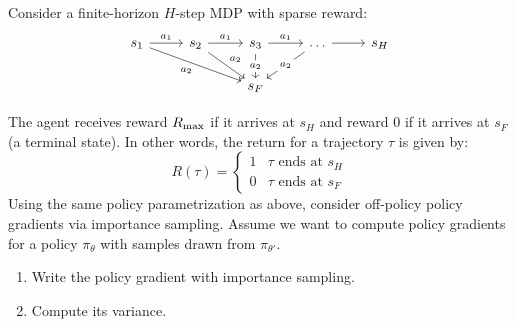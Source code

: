 \documentclass{article}
\begin{document}
\begin{enumerate}
\begin{enumerate}
\end{enumerate}
\newpage
{} Consider a finite-horizon $H$-step MDP with sparse reward:
\[\begin{tikzcd}
	{s_1} & {s_2} & {s_3} & \dots & {s_H} \\
	&& {s_F}
	\arrow["{a_1}", from=1-1, to=1-2]
	\arrow["{a_1}", from=1-2, to=1-3]
	\arrow["{a_2}"', from=1-1, to=2-3]
	\arrow["{a_1}", from=1-3, to=1-4]
	\arrow[from=1-4, to=1-5]
	\arrow["{a_2}", from=1-2, to=2-3]
	\arrow["{a_2}"{description}, from=1-3, to=2-3]
	\arrow["{a_2}"{description}, from=1-4, to=2-3]
\end{tikzcd}\]

The agent receives reward $R_{\textrm{max}}$ if it arrives at $s_H$ and reward $0$ if it arrives at $s_F$ (a terminal state). In other words, the return for a trajectory $\tau$ is given by:
\[R(\tau) = \begin{cases}1 & \tau \textrm{ ends at } s_H \\ 0 & \tau \textrm{ ends at } s_F \end{cases}\]
Using the same policy parametrization as above, consider off-policy policy gradients via importance sampling. Assume we want to compute policy gradients for a policy $\pi_\theta$ with samples drawn from $\pi_{\theta'}$.
\begin{enumerate}
    \item Write the policy gradient with importance sampling.

    \item Compute its variance.

\end{enumerate}

\end{enumerate}
\end{document}
